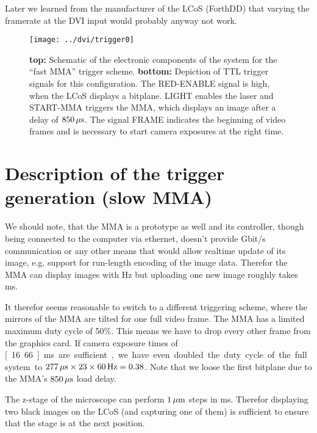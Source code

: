 Later we learned from the manufacturer of the LCoS (ForthDD) that
varying the framerate at the DVI input would probably anyway not work.

\begin{figure}[!hbt]
  \centering
  \texttt{[image: ../dvi/trigger0]}
  \caption{{\bf top:} Schematic of the electronic components of the
    system for the ``fast MMA'' trigger scheme. {\bf bottom:}
    Depiction of TTL trigger signals for this configuration. The
    \textsf{RED-ENABLE} signal is high, when the LCoS displays a
    bitplane. \textsf{LIGHT} enables the laser and \textsf{START-MMA}
    triggers the MMA, which displays an image after a delay of
    $\unit[850]{\mu s}$. The signal \textsf{FRAME} indicates the
    beginning of video frames and is necessary to start camera
    exposures at the right time.}
  \label{fig:trigger0}
\end{figure}


\section{Description of the trigger generation (slow MMA)}
\label{sec:dvi_slow}
We should note, that the MMA is a prototype as well and its
controller, though being connected to the computer via ethernet,
doesn't provide \unit[1]{Gbit/s} communication or any other means that
would allow realtime update of its image, e.g. support for run-length
encoding of the image data. Therefor the MMA can display images with
\unit[660]{Hz} but uploading one new image roughly takes
\unit[80]{ms}.

It therefor seems reasonable to switch to a different triggering
scheme, where the mirrors of the MMA are tilted for one full video
frame. The MMA has a limited maximum duty cycle of 50\%. This means we
have to drop every other frame from the graphics card. If camera
exposure times of \unit[16.66]{ms} are sufficient, we have even
doubled the duty cycle of the full system to $\unit[277]{\mu
  s}\times23\times\unit[60]{Hz}=0.38$. Note that we loose the first
bitplane due to the MMA's $\unit[850]{\mu s}$ load delay.

The z-stage of the microscope can perform $\unit[1]{\mu m}$ steps in
\unit[20]{ms}. Therefor displaying two black images on the LCoS (and
capturing one of them) is sufficient to ensure that the stage is at
the next position.

